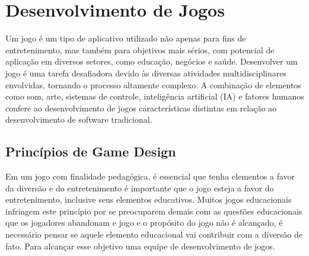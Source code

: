 % 

\section{Desenvolvimento de Jogos}
\label{sec-desenvolvimento-de-jogos}
Um jogo é um tipo de aplicativo utilizado não apenas para fins de entretenimento, mas também para objetivos mais sérios, com potencial de aplicação em diversos setores, como educação, negócios e saúde.
Desenvolver um jogo é uma tarefa desafiadora devido às diversas atividades multidisciplinares envolvidas, tornando o processo altamente complexo. A combinação de elementos como som, arte, sistemas de controle, inteligência artificial (IA) e fatores humanos confere ao desenvolvimento de jogos características distintas em relação ao desenvolvimento de software tradicional. 

\subsection{Princípios de Game Design}
Em um jogo com finalidade pedagógica, é essencial que tenha elementos a favor da diversão e do entretenimento é importante que o jogo esteja a favor do entretenimento, inclusive seus elementos educativos. Muitos jogos educacionais infringem este princípio por se preocuparem demais com as questões educacionais que os jogadores abandonam e jogo e o propósito do jogo não é alcançado, é necessário pensar se aquele elemento educacional vai contribuir com a diversão de fato. Para alcançar esse objetivo uma equipe de desenvolvimento de jogos.

